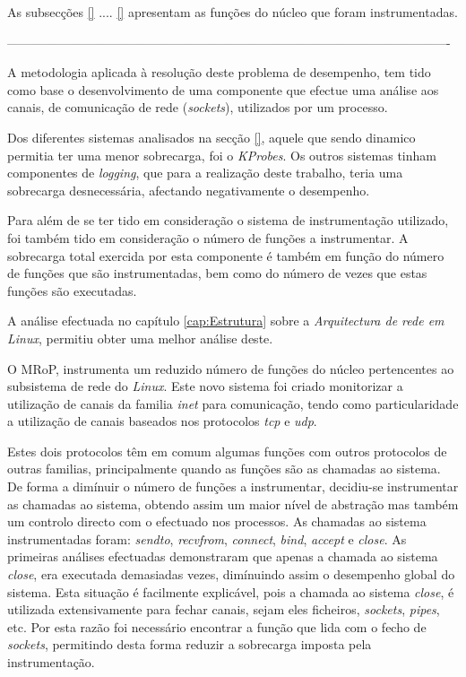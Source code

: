 As subsecções \ref{} .... \ref{} apresentam as funções do núcleo que foram instrumentadas.

%
%

----------------------------------------------------------------------------------------------------------

A metodologia aplicada à resolução deste problema de desempenho, tem tido como base o desenvolvimento de uma componente que efectue uma análise aos canais, de comunicação de rede (\textit{sockets}), utilizados por um processo.

Dos diferentes sistemas analisados na secção \ref{}, aquele que sendo dinamico permitia ter uma menor sobrecarga, foi o \textit{KProbes}.
Os outros sistemas tinham componentes de \textit{logging}, que para a realização deste trabalho, teria uma sobrecarga desnecessária, afectando negativamente o desempenho.

Para além de se ter tido em consideração o sistema de instrumentação utilizado, foi também tido em consideração o número de funções a instrumentar.
A sobrecarga total exercida por esta componente é também em função do número de funções que são instrumentadas, bem como do número de vezes que estas funções são executadas.

A análise efectuada no capítulo \ref{cap:Estrutura} sobre a \textit{Arquitectura de rede em Linux}, permitiu obter uma melhor análise deste.

O MRoP, instrumenta um reduzido número de funções do núcleo pertencentes ao subsistema de rede do \textit{Linux}.
Este novo sistema foi criado monitorizar a utilização de canais da familia \textit{inet} para comunicação, tendo como particularidade a utilização de canais baseados nos protocolos \textit{tcp} e \textit{udp}.


Estes dois protocolos têm em comum algumas funções com outros protocolos de outras familias, principalmente quando as funções são as chamadas ao sistema.
De forma a dimínuir o número de funções a instrumentar, decidiu-se instrumentar as chamadas ao sistema, obtendo assim um maior nível de abstração mas também um controlo directo com o efectuado nos processos.
As chamadas ao sistema instrumentadas foram: \textit{sendto}, \textit{recvfrom}, \textit{connect}, \textit{bind}, \textit{accept} e \textit{close}.
As primeiras análises efectuadas demonstraram que apenas a chamada ao sistema \textit{close}, era executada demasiadas vezes, dimínuindo assim o desempenho global do sistema.
Esta situação é facilmente explicável, pois a chamada ao sistema \textit{close}, é utilizada extensivamente para fechar canais, sejam eles ficheiros, \textit{sockets}, \textit{pipes}, etc.
Por esta razão foi necessário encontrar a função que lida com o fecho de \textit{sockets}, permitindo desta forma reduzir a sobrecarga imposta pela instrumentação.


